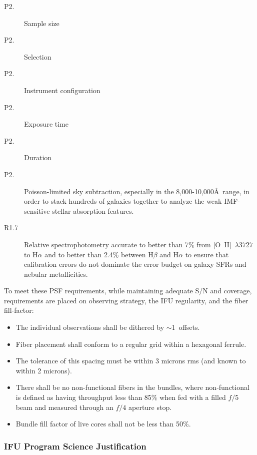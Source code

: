 \documentclass[preprint,11pt]{aastex}
\begin{document}
\begin{description}

\item[P2.] Sample size
\item[P2.] Selection 
\item[P2.] Instrument configuration 
\item[P2.] Exposure time
\item[P2.] Duration

\item[P2.] Poisson-limited sky subtraction, especially in the
  8,000-10,000\AA\ range, in order to stack hundreds of galaxies
  together to analyze the weak IMF-sensitive stellar absorption
  features.


\item[R1.7] Relative spectrophotometry accurate to better than 7\%
  from [O~II]~$\lambda3727$ to H$\alpha$ and to better than 2.4\%
  between H$\beta$ and H$\alpha$ to ensure that calibration errors do
  not dominate the error budget on galaxy SFRs and nebular
  metallicities.

  
\end{description}

\medskip
\noindent To meet these PSF requirements, while maintaining adequate
S/N and coverage, requirements are placed on observing
strategy, the IFU regularity, and the fiber fill-factor:

\begin{itemize}

\item The individual observations shall be dithered by $\sim$1\arcsec\
  offsets.

\item Fiber placement shall conform to a regular grid within a
  hexagonal ferrule.  

\item The tolerance of this spacing must be within 3 microns rms (and
  known to within 2 microns).

\item There shall be no non-functional fibers in the bundles, where
  non-functional is defined as having throughput less than 85\% when
  fed with a filled $f/5$ beam and measured through an $f/4$ aperture
  stop.

\item Bundle fill factor of live cores shall not be less than 50\%.

\end{itemize}


\subsubsection{IFU Program Science Justification}
\end{document}
